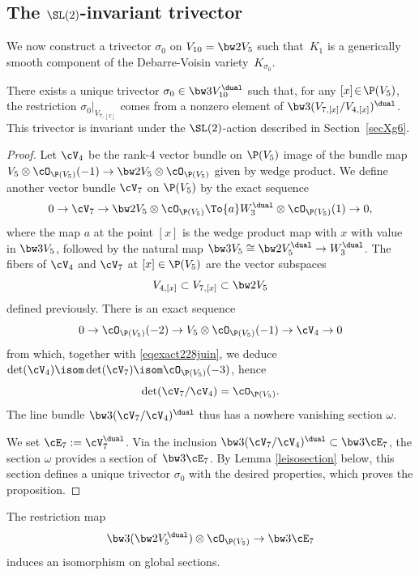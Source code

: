 \subsection{The $\SL(2)$-invariant trivector}\label{se62}

We now construct a trivector $\sigma_0$ on $V_{10}=\bw2V_5$ such that~$K_1$ is a generically smooth component of the Debarre-Voisin
variety~$K_{\sigma_0}$.

\begin{prop}\label{proexistencesigma}
There exists a unique trivector
$\sigma_0\in \bw3V_{10}^\dual$ such that,
for any \hbox{$[x]\!\in\!\P(V_5)$},
the restriction
$\sigma_{0}\vert_{ V_{7,[x]}}$ comes from a nonzero element of $\bw3(V_{7,[x]}/V_{4,[x]})^\dual$. This trivector is invariant under the $\SL(2)$-action described in Section~\ref{secXg6}.
\end{prop}

\begin{proof}
Let $\cV_4$ be the rank-4 vector bundle on $\P(V_5)$ image of the
bundle map $V_5\otimes \cO_{\P(V_5)}(-1)
\to\bw2V_5\otimes \cO_{\P(V_5)}$ given by wedge product. We define another vector bundle
$\cV_7$ on $\P(V_5)$ by the exact sequence
\begin{equation} \label{eqexact228juin}
0\to \cV_7\to \bw2V_5\otimes \cO_{\P(V_5)}
\To{a} W^\dual_3\otimes \cO_{\P(V_5)}(1)\to 0,
\end{equation}
where the map $a$ at the point $[x]$ is the wedge product map with $x$ with value in
$\bw3V_5$, followed by the natural map $\bw3V_5\cong \bw2 V_5^\dual\to W_3^\dual$. The fibers of $\cV_4$ and $\cV_7$ at $[x]\in \P(V_5)$ are the vector subspaces
\[
V_{4,[x]}\subset V_{7,[x]}\subset \bw2V_5 
\]
defined previously. There is an exact sequence
\[
0\to \cO_{\P(V_5)}(-2)\to V_5\otimes \cO_{\P(V_5)}(-1)
\to \cV_4 \to 0
\]
from which, together with \eqref{eqexact228juin}, we deduce
$\det (\cV_4)\isom \det ( \cV_7)\isom\cO_{\P(V_5)}(-3) $,
hence
\[
\det(\cV_7/\cV_4)=\cO_{\P(V_5)}.
\]
The line bundle $\bw3(\cV_7/\cV_4)^\dual$ thus has a nowhere vanishing section
$\omega$.

We set $\cE_7:=\cV_7^\dual$. Via the inclusion $\bw3(\cV_7/\cV_4)^\dual\subset \bw3\cE_7$, the section ${\omega}$ provides a section of~$\bw3\cE_7$. By Lemma \ref{leisosection} below, this section defines a unique trivector $\sigma_0$ with the desired properties, which proves the proposition.\end{proof}

\begin{lemm}\label{leisosection}
The restriction map
\[
\bw3(\bw2V_5^\dual)\otimes \cO_{\P(V_5)}\to \bw3\cE_7
\]
induces an isomorphism on global sections.
\end{lemm}

